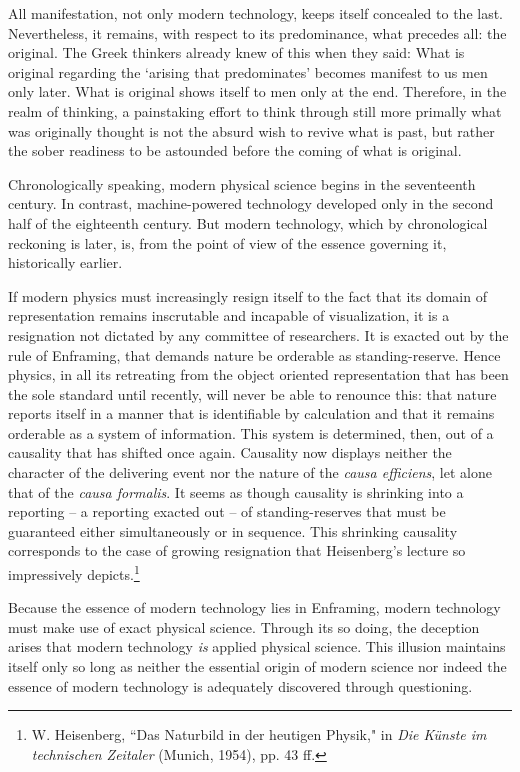 \documentclass[paper=a4, fontsize=11pt,twoside]{scrartcl}
\begin{document}
All manifestation, not only modern technology, keeps itself concealed to the last. Nevertheless, it remains, with respect to its predominance, what precedes all: the original. The Greek thinkers already knew of this when they said: What is original regarding the `arising that predominates' becomes manifest to us men only later. What is original shows itself to men only at the end. Therefore, in the realm of thinking, a painstaking effort to think through still more primally what was originally thought is not the absurd wish to revive what is past, but rather the sober readiness to be astounded before the coming of what is original.

Chronologically speaking, modern physical science begins in the seventeenth century. In contrast, machine-powered technology developed only in the second half of the eighteenth century. But modern technology, which by chronological reckoning is later, is, from the point of view of the essence governing it, historically earlier.

If modern physics must increasingly resign itself to the fact that its domain of representation remains inscrutable and incapable of visualization, it is a resignation not dictated by any committee of researchers. It is exacted out by the rule of Enframing, that demands nature be orderable as standing-reserve. Hence physics, in all its retreating from the object oriented representation that has been the sole standard until recently, will never be able to renounce this: that nature reports itself in a manner that is identifiable by calculation and that it remains orderable as a system of information. This system is determined, then, out of a causality that has shifted once again. Causality now displays neither the character of the delivering event nor the nature of the \textit{causa efficiens}, let alone that of the \textit{causa formalis}. It seems as though causality is shrinking into a reporting -- a reporting exacted out -- of standing-reserves that must be guaranteed either simultaneously or in sequence.  This shrinking causality corresponds to the case of growing resignation that Heisenberg's lecture so impressively depicts.\footnote[1]{W. Heisenberg, ``Das Naturbild in der heutigen Physik," in \textit{Die K{\"u}nste im technischen Zeitaler} (Munich, 1954), pp. 43 ff.}

Because the essence of modern technology lies in Enframing, modern technology must make use of exact physical science. Through its so doing, the deception arises that modern technology \textit{is} applied physical science. This illusion maintains itself only so long as neither the essential origin of modern science nor indeed the essence of modern technology is adequately discovered through questioning.
\end{document}
